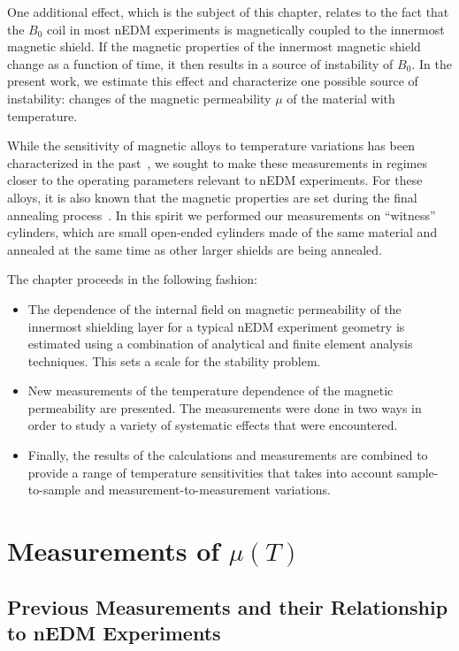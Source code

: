 One additional effect, which is the subject of this chapter, relates to
the fact that the $B_0$ coil in most nEDM experiments is magnetically
coupled to the innermost magnetic shield. If the magnetic properties
of the innermost magnetic shield change as a function of time, it then
results in a source of instability of $B_0$.  In the present work, we
estimate this effect and characterize one possible source of
instability: changes of the magnetic permeability $\mu$ of the
material with temperature.

While the sensitivity of magnetic alloys to temperature variations has
been characterized in the past~\cite{couderchon1982some,kruppvdm}, we
sought to make these measurements in regimes closer to the operating
parameters relevant to nEDM experiments.  For these alloys, it is also
known that the magnetic properties are set during the final annealing
process~\cite{gupta2007influence,bozorth1993ferromagnetism,kruppvdm}.
In this spirit we performed our measurements on ``witness'' cylinders,
which are small open-ended cylinders made of the same material and
annealed at the same time as other larger shields are being annealed.

The chapter proceeds in the following fashion:
\begin{itemize}
\item The dependence of the internal field on magnetic permeability of
  the innermost shielding layer for a typical nEDM experiment geometry
  is estimated using a combination of analytical and finite element
  analysis techniques.  This sets a scale for the stability problem.
\item New measurements of the temperature dependence of the magnetic
  permeability are presented.  The measurements were done in two ways
  in order to study a variety of systematic effects that were
  encountered.
\item Finally, the results of the calculations and measurements are
  combined to provide a range of temperature sensitivities that takes
  into account sample-to-sample and measurement-to-measurement
  variations.
\end{itemize}





\section{Measurements of $\mu(T)$\label{sec:tdep}}

\subsection{Previous Measurements and their Relationship to nEDM Experiments\label{sec:previousmeasurement}}

